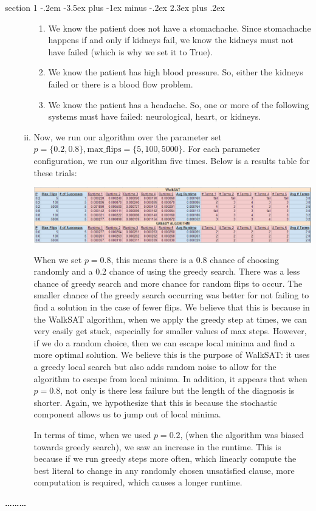 \documentclass[12pt]{article}
\makeatletter
\newenvironment{problem}{\@startsection
       {section}
       {1}
       {-.2em}
       {-3.5ex plus -1ex minus -.2ex}
       {2.3ex plus .2ex}
       {\pagebreak[3] %
       \large\bf\noindent{Problem }
       }
       }
       {%
       \begin{center}\large\bf \ldots\ldots\ldots\end{center}}
\makeatother
\begin{document}
\begin{problem}{}
\begin{enumerate}[a.]
\begin{enumerate}[i.]
\begin{enumerate}
\item We know the patient does not have a stomachache. Since stomachache happens if and only if kidneys fail, we know the kidneys must not have failed (which is why we set it to True).

\item We know the patient has high blood pressure. So, either the kidneys failed or there is a blood flow problem.

\item We know the patient has a headache. So, one or more of the following systems must have failed: neurological, heart, or kidneys.
\end{enumerate}

\item Now, we run our algorithm over the parameter set $p = \{0.2, 0.8\}, \textrm{max\_flips} = \{5, 100, 5000\}$. For each parameter configuration, we run our algorithm five times. Below is a results table for these trials:
\begin{center}
\includegraphics[width=\textwidth]{results.png}
\end{center}

When we set $p=0.8$, this means there is a 0.8 chance of choosing randomly and a 0.2 chance of using the greedy search. There was a less chance of greedy search and more chance for random flips to occur. The smaller chance of the greedy search occurring was better for not failing to find a solution in the case of fewer flips. We believe that this is because in the WalkSAT algorithm, when we apply the greedy step at times, we can very easily get stuck, especially for smaller values of max steps. However, if we do a random choice, then we can escape local minima and find a more optimal solution. We believe this is the purpose of WalkSAT: it uses a greedy local search but also adds random noise to allow for the algorithm to escape from local minima. In addition, it appears that when $p = 0.8$, not only is there less failure but the length of the diagnosis is shorter. Again, we hypothesize that this is because the stochastic component allows us to jump out of local minima. 

In terms of time, when we used $p=0.2$, (when the algorithm was biased towards greedy search), we saw an increase in the runtime. This is because if we run greedy steps more often, which linearly compute the best literal to change in any randomly chosen unsatisfied clause, more computation is required, which causes a longer runtime.
\end{enumerate}
\end{enumerate}
\end{problem}
\end{document}
